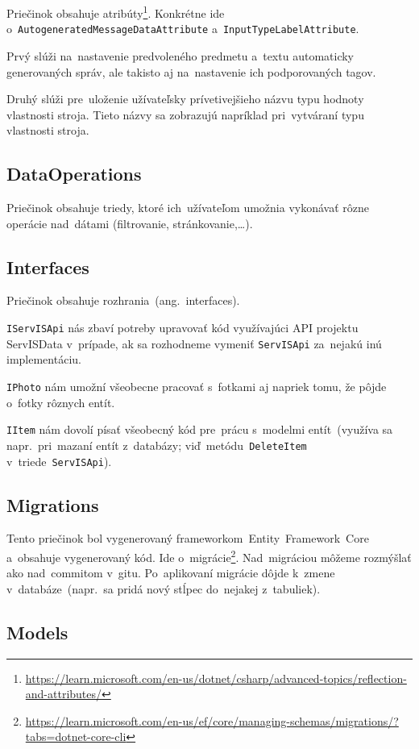 Priečinok obsahuje atribúty\footnote{\url{https://learn.microsoft.com/en-us/dotnet/csharp/advanced-topics/reflection-and-attributes/}}. Konkrétne ide o~\verb|AutogeneratedMessageDataAttribute| a~\verb|InputTypeLabelAttribute|.

Prvý slúži na~nastavenie predvoleného predmetu a~textu automaticky generovaných správ, ale takisto aj na~nastavenie ich podporovaných tagov.

Druhý slúži pre~uloženie užívateľsky prívetivejšieho názvu typu hodnoty vlastnosti stroja. Tieto názvy sa zobrazujú napríklad pri~vytváraní typu vlastnosti stroja.

\subsection{DataOperations}
\label{dataoperations}

Priečinok obsahuje triedy, ktoré ich~užívateľom umožnia vykonávať rôzne operácie nad~dátami (filtrovanie, stránkovanie,\dots).

\subsection{Interfaces}

Priečinok obsahuje rozhrania~(ang.~interfaces).

\verb|IServISApi| nás zbaví potreby upravovať kód využívajúci API projektu ServISData v~prípade, ak sa rozhodneme vymeniť \verb|ServISApi| za~nejakú inú implementáciu.

\verb|IPhoto| nám umožní všeobecne pracovať s~fotkami aj napriek tomu, že pôjde o~fotky rôznych entít.

\verb|IItem| nám dovolí písať všeobecný kód pre~prácu s~modelmi entít~(využíva sa napr.~pri~mazaní entít z~databázy; viď~metódu~\verb|DeleteItem| v~triede~\verb|ServISApi|).

\subsection{Migrations}

Tento priečinok bol vygenerovaný frameworkom~Entity~Framework~Core a~obsahuje vygenerovaný kód. Ide o~migrácie\footnote{\url{https://learn.microsoft.com/en-us/ef/core/managing-schemas/migrations/?tabs=dotnet-core-cli}}. Nad~migráciou môžeme rozmýšlať ako nad~commitom v~gitu. Po~aplikovaní migrácie dôjde k~zmene v~databáze~(napr.~sa pridá nový stĺpec do~nejakej z~tabuliek).

\subsection{Models}
\label{models}

